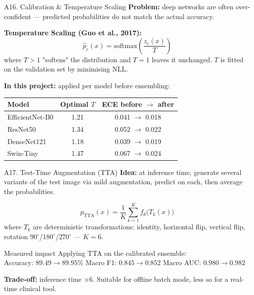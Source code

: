 \documentclass[10pt, aspectratio=169]{beamer}
\begin{document}
\begin{frame}{A16. Calibration \& Temperature Scaling}
    \footnotesize
    \textbf{Problem:} deep networks are often over-confident --- predicted probabilities do not match the actual accuracy.

    \vspace{0.2cm}
    \textbf{Temperature Scaling (Guo et al., 2017):}
    \[
        \hat{p}_c(x) = \mathrm{softmax}\!\left(\frac{z_c(x)}{T}\right)
    \]
    where $T > 1$ "softens" the distribution and $T = 1$ leaves it unchanged. $T$ is fitted on the validation set by minimising NLL.

    \vspace{0.2cm}
    \textbf{In this project:} applied per model before ensembling:
    \begin{table}[]
        \scriptsize \centering
        \begin{tabular}{lcc}
        \toprule
        \rowcolor{usthblue!25} \textbf{Model} & \textbf{Optimal $T$} & \textbf{ECE before $\rightarrow$ after} \\
        \midrule
        EfficientNet-B0 & 1.21 & 0.041 $\rightarrow$ 0.018 \\
        ResNet50        & 1.34 & 0.052 $\rightarrow$ 0.022 \\
        DenseNet121     & 1.18 & 0.039 $\rightarrow$ 0.019 \\
        Swin-Tiny       & 1.47 & 0.067 $\rightarrow$ 0.024 \\
        \bottomrule
        \end{tabular}
    \end{table}
\end{frame}

\begin{frame}{A17. Test-Time Augmentation (TTA)}
    \footnotesize
    \textbf{Idea:} at inference time, generate several variants of the test image via mild augmentation, predict on each, then average the probabilities.

    \[
        p_{\text{TTA}}(x) = \frac{1}{K}\sum_{k=1}^{K} f_\theta\bigl(T_k(x)\bigr)
    \]
    where $T_k$ are deterministic transformations: identity, horizontal flip, vertical flip, rotation $90^\circ$/$180^\circ$/$270^\circ$ --- $K = 6$.

    \vspace{0.2cm}
    \begin{block}{Measured impact}
        \footnotesize Applying TTA on the calibrated ensemble:\\[2pt]
        Accuracy: $89.49 \rightarrow 89.95\%$ \quad Macro F1: $0.845 \rightarrow 0.852$ \quad Macro AUC: $0.980 \rightarrow 0.982$
    \end{block}

    \textbf{Trade-off:} inference time $\times 6$. Suitable for offline batch mode, less so for a real-time clinical tool.
\end{frame}
\end{document}
